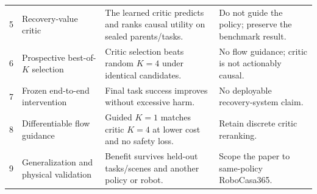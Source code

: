 \begin{longtable}{P{0.07\textwidth}P{0.28\textwidth}P{0.28\textwidth}P{0.269\textwidth}}
5 & Recovery-value critic & The learned critic predicts and ranks causal utility on sealed parents/tasks. & Do not guide the policy; preserve the benchmark result. \\
6 & Prospective best-of-$K$ selection & Critic selection beats random $K=4$ under identical candidates. & No flow guidance; critic is not actionably causal. \\
7 & Frozen end-to-end intervention & Final task success improves without excessive harm. & No deployable recovery-system claim. \\
8 & Differentiable flow guidance & Guided $K=1$ matches critic $K=4$ at lower cost and no safety loss. & Retain discrete critic reranking. \\
9 & Generalization and physical validation & Benefit survives held-out tasks/scenes and another policy or robot. & Scope the paper to same-policy RoboCasa365. \\
\bottomrule
\end{longtable}


